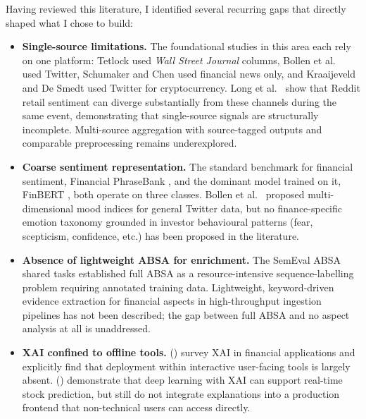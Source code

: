 Having reviewed this literature, I identified several recurring gaps that directly shaped what I chose to build:

\begin{itemize}
    \item \textbf{Single-source limitations.}
    The foundational studies in this area each rely on one platform:
    Tetlock \citeyearpar{tetlock2007giving} used \textit{Wall Street Journal}
    columns, Bollen et al.\ \citeyearpar{bollen2011twitter} used Twitter,
    Schumaker and Chen \citeyearpar{schumaker2009textmining} used financial
    news only, and Kraaijeveld and De Smedt \citeyearpar{kraaijeveld2020predictive}
    used Twitter for cryptocurrency.
    Long et al.\ \citeyearpar{long2023reddit} show that Reddit retail
    sentiment can diverge substantially from these channels during the same
    event, demonstrating that single-source signals are structurally
    incomplete. Multi-source aggregation with source-tagged outputs and
    comparable preprocessing remains underexplored.

    \item \textbf{Coarse sentiment representation.}
    The standard benchmark for financial sentiment, Financial PhraseBank
    \citep{malo2014financialphrasebank}, and the dominant model trained on
    it, FinBERT \citep{araci2019finbert}, both operate on three classes.
    Bollen et al.\ \citeyearpar{bollen2011twitter} proposed multi-dimensional
    mood indices for general Twitter data, but no finance-specific emotion
    taxonomy grounded in investor behavioural patterns (fear, scepticism,
    confidence, etc.) has been proposed in the literature.

    \item \textbf{Absence of lightweight ABSA for enrichment.}
    The SemEval ABSA shared tasks \citep{pontiki2014semeval} established
    full ABSA as a resource-intensive sequence-labelling problem requiring
    annotated training data.  Lightweight, keyword-driven evidence extraction
    for financial aspects in high-throughput ingestion pipelines has not been
    described; the gap between full ABSA and no aspect analysis at all is
    unaddressed.

    \item \textbf{XAI confined to offline tools.}
    \citeauthor{yeo2023xai} (\citeyear{yeo2023xai}) survey XAI in financial
    applications and explicitly find that deployment within interactive
    user-facing tools is largely absent.  \citeauthor{bala2025integration}
    (\citeyear{bala2025integration}) demonstrate that deep learning with XAI
    can support real-time stock prediction, but still do not integrate
    explanations into a production frontend that non-technical users can
    access directly.


\end{itemize}
